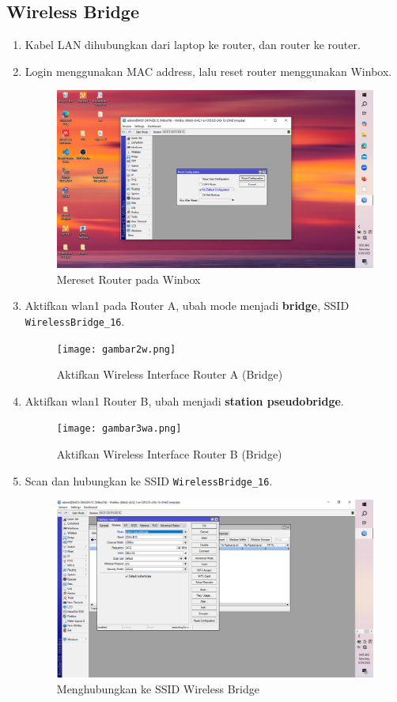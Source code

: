 \subsection{Wireless Bridge}
\begin{enumerate}
    \item Kabel LAN dihubungkan dari laptop ke router, dan router ke router.
    \item Login menggunakan MAC address, lalu reset router menggunakan Winbox.
    \begin{figure}[H]
        \centering
        \includegraphics[width=0.5\linewidth]{gambar1.png}
        \caption{Mereset Router pada Winbox}
        \label{fig:reset-bridge}
    \end{figure}

    \item Aktifkan wlan1 pada Router A, ubah mode menjadi \textbf{bridge}, SSID \texttt{WirelessBridge\_16}.
    \begin{figure}[H]
        \centering
        \texttt{[image: gambar2w.png]}
        \caption{Aktifkan Wireless Interface Router A (Bridge)}
        \label{fig:wlan-a-bridge}
    \end{figure}

    \item Aktifkan wlan1 Router B, ubah menjadi \textbf{station pseudobridge}.
    \begin{figure}[H]
        \centering
        \texttt{[image: gambar3wa.png]}
        \caption{Aktifkan Wireless Interface Router B (Bridge)}
        \label{fig:wlan-b-bridge}
    \end{figure}

    \item Scan dan hubungkan ke SSID \texttt{WirelessBridge\_16}.
    \begin{figure}[H]
        \centering
        \includegraphics[width=0.5\linewidth]{gambar3w.png}
        \caption{Menghubungkan ke SSID Wireless Bridge}
        \label{fig:ssid-bridge}
    \end{figure}


\end{enumerate}

